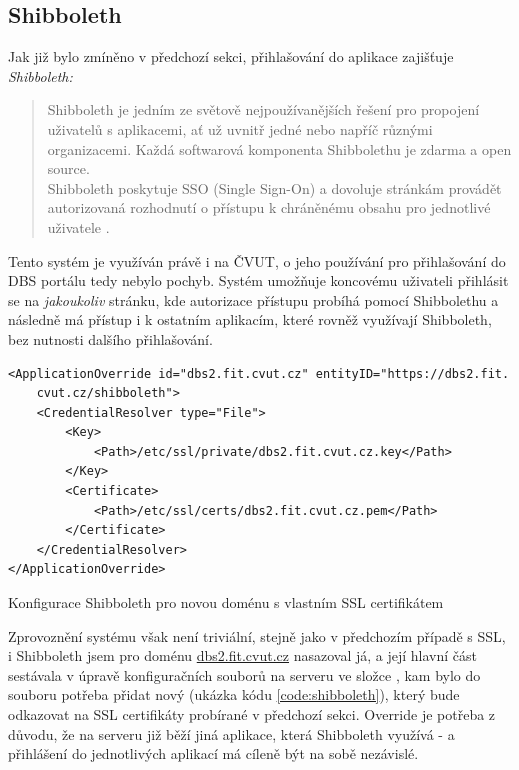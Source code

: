 \subsection{Shibboleth} \label{app:shibboleth}

Jak již bylo zmíněno v předchozí sekci, přihlašování do aplikace zajišťuje \emph{Shibboleth:}
\begin{quote}
Shibboleth je jedním ze světově nejpoužívanějších řešení pro propojení uživatelů s aplikacemi, ať už uvnitř jedné nebo napříč různými organizacemi. Každá softwarová komponenta Shibbolethu je zdarma a open source.\\
Shibboleth poskytuje SSO (Single Sign-On) a dovoluje stránkám provádět autorizovaná rozhodnutí o přístupu k chráněnému obsahu pro jednotlivé uživatele \cite{shibboleth}.
\end{quote}
Tento systém je využíván právě i na ČVUT, o jeho používání pro přihlašování do DBS portálu tedy nebylo pochyb. Systém umožňuje koncovému uživateli přihlásit se na \emph{jakoukoliv} stránku, kde autorizace přístupu probíhá pomocí Shibbolethu a následně má přístup i k ostatním aplikacím, které rovněž využívají Shibboleth, bez nutnosti dalšího přihlašování.\\
\begin{listing}
	\begin{verbatim}
<ApplicationOverride id="dbs2.fit.cvut.cz" entityID="https://dbs2.fit.
    cvut.cz/shibboleth">
    <CredentialResolver type="File">
        <Key>
            <Path>/etc/ssl/private/dbs2.fit.cvut.cz.key</Path>
        </Key>
        <Certificate>
            <Path>/etc/ssl/certs/dbs2.fit.cvut.cz.pem</Path>
        </Certificate>
    </CredentialResolver>
</ApplicationOverride>
	\end{verbatim}
	\caption{Konfigurace Shibboleth pro novou doménu s vlastním SSL certifikátem} \label{code:shibboleth}
\end{listing}
Zprovoznění systému však není triviální, stejně jako v předchozím případě s SSL, i Shibboleth jsem pro doménu \url{dbs2.fit.cvut.cz} nasazoval já, a její hlavní část sestávala v úpravě konfiguračních souborů na serveru ve složce , kam bylo do souboru  potřeba přidat nový  (ukázka kódu \ref{code:shibboleth}), který bude odkazovat na SSL certifikáty probírané v předchozí sekci. Override je potřeba z důvodu, že na serveru již běží jiná aplikace, která Shibboleth využívá -  a přihlášení do jednotlivých aplikací má cíleně být na sobě nezávislé.\\
